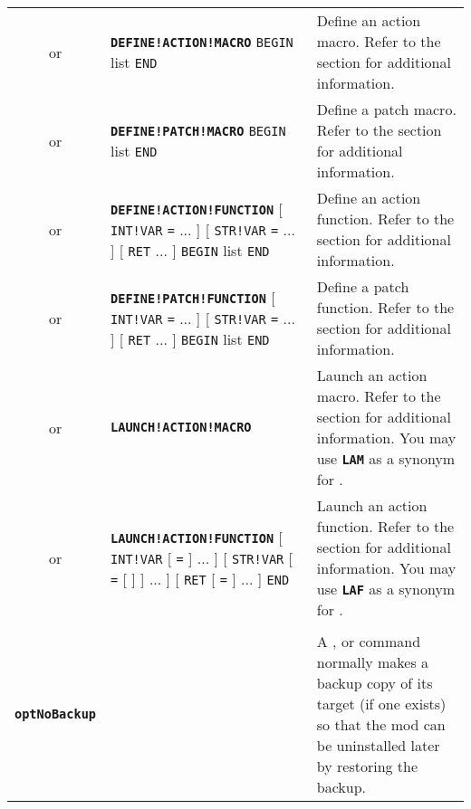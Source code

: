 \documentclass{article}
\def\ttref#1{\ahrefloc{#1}{\tt #1}}
\def\DEFINE#1{{\tt \bf #1}\label{#1}\index{#1}}
\def\t#1{{\tt #1}}
\def\Slist{{\color{red} list }}
\def\Ob{{\color{red} [ }}
\def\Oe{{\color{red} ] }}
\begin{document}
\begin{tabular}{cp{10in}|p{10in}}
or & \DEFINE{DEFINE!ACTION!MACRO} \ttref{String} \t{BEGIN}
     \ttref{TP2 Action} \Slist \t{END} &
  Define an action macro. Refer to the \ttref{macros} section for
  additional information. \\
or & \DEFINE{DEFINE!PATCH!MACRO} \ttref{String} \t{BEGIN}
     \ttref{patch} \Slist \t{END} &
  Define a patch macro. Refer to the \ttref{macros} section for
  additional information. \\
or & \DEFINE{DEFINE!ACTION!FUNCTION} \ttref{String}
     \Ob \t{INT!VAR} \ttref{variable} \t{=} \ttref{value} ... \Oe
     \Ob \t{STR!VAR} \ttref{variable} \t{=} \ttref{String} ... \Oe
     \Ob \t{RET} \ttref{variable} ... \Oe \t{BEGIN} \ttref{TP2 Action} \Slist
     \t{END} &
  Define an action function. Refer to the \ttref{Functions} section for
  additional information. \\
or & \DEFINE{DEFINE!PATCH!FUNCTION} \ttref{String}
     \Ob \t{INT!VAR} \ttref{variable} \t{=} \ttref{value} ... \Oe
     \Ob \t{STR!VAR} \ttref{variable} \t{=} \ttref{String} ... \Oe
     \Ob \t{RET} \ttref{variable} ... \Oe \t{BEGIN} \ttref{patch} \Slist
     \t{END} &
  Define a patch function. Refer to the \ttref{Functions} section for
  additional information. \\
or & \DEFINE{LAUNCH!ACTION!MACRO} \ttref{String} &
  Launch an action macro. Refer to the \ttref{macros} section for
  additional information. You may use \DEFINE{LAM} as a synonym for
  \ttref{LAUNCH!ACTION!MACRO}.\\
or & \DEFINE{LAUNCH!ACTION!FUNCTION} \ttref{String}
     \Ob \t{INT!VAR} \ttref{variable} \Ob \t{=} \ttref{value} \Oe ... \Oe
     \Ob \t{STR!VAR} \ttref{variable} \Ob \t{=} \Ob \ttref{EVALUATE!BUFFER}
     \Oe \ttref{String} \Oe ... \Oe
     \Ob \t{RET} \ttref{variable} \Ob \t{=} \ttref{String} \Oe ... \Oe
     \t{END} &
  Launch an action function. Refer to the \ttref{Functions} section for
  additional information. You may use \DEFINE{LAF} as a synonym for
  \ttref{LAUNCH!ACTION!FUNCTION}.\\
\\

\DEFINE{optNoBackup} & &
  A \ttref{COPY}, \ttref{MOVE} or \ttref{DELETE} command normally makes a backup copy of its target (if one
  exists) so that the mod can be uninstalled later by restoring the backup.
  \\


\end{tabular}
\end{document}
